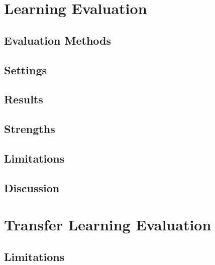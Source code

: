 \section{Learning Evaluation}
\label{learning_evaluation}

\subsection{Evaluation Methods}

\subsection{Settings}

\subsection{Results}

\subsection{Strengths}

\subsection{Limitations}

\subsection{Discussion}

\section{Transfer Learning Evaluation}
\label{transfer_learning}

\subsection{Limitations}
